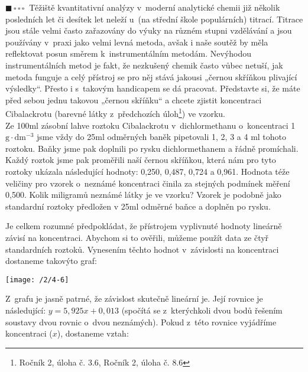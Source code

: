 \documentclass{book}
\newcommand{\jeden}{$\blacksquare \, \square \, \square \, \square \; \; $}
\renewenvironment{quotation}{\par}{\par} %
\begin{document}
\begin{quotation}
\jeden Těžiště kvantitativní analýzy v~moderní analytické chemii již několik
posledních let či desítek let neleží u~(na střední škole populárních)
titrací. Titrace jsou stále velmi často zařazovány do výuky na různém
stupni vzdělávání a jsou používány v~praxi jako velmi levná metoda,
avšak i naše soutěž by měla reflektovat posun směrem k~instrumentálním
metodám. Nevýhodou instrumentálních metod je fakt, že nezkušený chemik
často vůbec netuší, jak metoda funguje a celý přístroj se pro něj
stává jakousi „černou skříňkou plivající výsledky“. Přesto i s~takovým
handicapem se dá pracovat. Představte si, že máte před sebou jednu
takovou „černou skříňku“ a chcete zjistit koncentraci Cibalackrotu
(barevné látky z~předchozích úloh\footnote{Ročník 2, úloha č. 3.6, Ročník 2, úloha č. 8.6}) ve vzorku.\\
Ze 100ml zásobní lahve roztoku Cibalackrotu v~dichlormethanu o~koncentraci 1 $\mathrm{g\cdot dm^{-3}}$
jsme vždy do 25ml odměrných baněk pipetovali 1, 2, 3 a 4 ml tohoto
roztoku. Baňky jsme pak doplnili po rysku dichlormethanem a řádně
promíchali. Každý roztok jsme pak proměřili naší černou skříňkou,
která nám pro tyto roztoky ukázala následující hodnoty: 0,250, 0,487,
0,724 a 0,961. Hodnota téže veličiny pro vzorek o~neznámé koncentraci
činila za stejných podmínek měření 0,500. Kolik miligramů neznámé
látky je ve vzorku? Vzorek je podobně jako standardní roztoky předložen
v 25ml odměrné baňce a doplněn po rysku.
\end{quotation} \dotfill \par 
Je celkem rozumné předpokládat, že přístrojem vyplivnuté hodnoty lineárně
závisí na koncentraci. Abychom si to ověřili, můžeme použít data ze
čtyř standardních roztoků. Vynesením těchto hodnot v~závislosti
na koncentraci dostaneme takovýto graf:

\begin{center}
\texttt{[image: /2/4-6]}
\end{center}

Z~grafu je jasně patrné, že závislost skutečně lineární je. Její rovnice
je následující: $y=5,925x+0,013$ (spočítá se z~kterýchkoli dvou bodů
řešením soustavy dvou rovnic o~dvou neznámých). Pokud z~této rovnice vyjádříme
koncentraci ($x$), dostaneme vztah:
\end{document}
